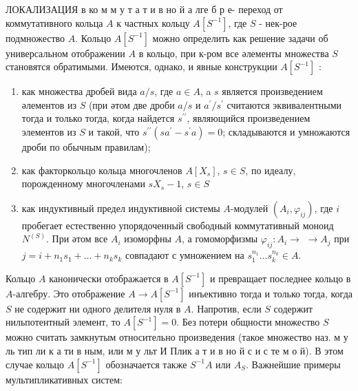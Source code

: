 \documentclass[10pt]{article}
\begin{document}
ЛОКАЛИЗАЦИЯ в ко м м у т а т и в но й а лге б р е- переход от коммутативного кольца $A$ к частных кольцу $A\left[S^{-1}\right]$, где $S$ - нек-рое подмножество $A$. Кольцо $A\left[S^{-1}\right]$ можно определить как решение задачи об универсальном отображении $A$ в кольцо, при к-ром все әлементы множества $S$ становятся обратимыми. Имеются, однако, и явные конструкции $A\left[S^{-1}\right]$ :



\begin{enumerate}

  \item как множества дробей вида $a / s$, где $a \in A$, a $s$ является произведением әлементов из $S$ (при әтом две дроби $a / s$ и $a^{\prime} / s^{\prime}$ считаются эквивалентными тогда и только тогда, когда найдется $s^{\prime \prime}$, являющийся произведением элементов из $S$ и такой, что $s^{\prime \prime}\left(s a^{\prime}-s^{\prime} a\right)=0$; складываются и умножаются дроби по обычным правилам);



  \item как факторкольцо кольца многочленов $A\left[X_{s}\right]$, $s \in S$, по идеалу, порожденному многочленами $s X_{s}-1$, $s \in S$



  \item как индуктивный предел индуктивной системы $A$-модулей $\left(A_{i}, \varphi_{i j}\right)$, где $i$ пробегает естественно упорядоченный свободный коммутативный моноид $N^{(S)}$. При әтом все $A_{i}$ изоморфны $A$, а гомоморфизмы $\varphi_{i j}: A_{i} \rightarrow$ $\rightarrow A_{j}$ при $j=i+n_{1} s_{1}+\ldots+n_{k} s_{k}$ совпадают с умножением на $s_{1}^{n_{1}} \ldots s_{k}^{n_{k}} \in A$.



\end{enumerate}



Кольцо $A$ канонически отображается в $A\left[S^{-1}\right]$ и превращает последнее кольцо в $A$-алгебру. Это отображение $A \rightarrow A\left[S^{-1}\right]$ инъективно тогда и только тогда, когда $S$ не содержит ни одного делителя нуля в $A$. Напротив, если $S$ содержит нильпотентный элемент, то $A\left[S^{-1}\right]=0$. Без потери общности множество $S$ можно считать замкнутым относительно произведения (такое множество наз. м у ль тип ли к а ти в ным, или м у льт И Плик а т и в но й с и с те м о й). В этом случае кольцо $A\left[S^{-1}\right]$ обозначается также $S^{-1} A$ или $A_{S}$. Важнейшие примеры мультипликативных систем:
\end{document}

